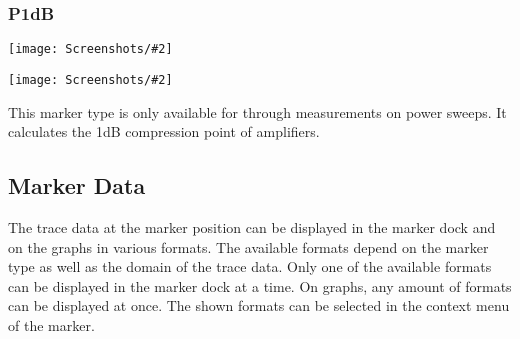 \documentclass[a4paper,11pt]{article}
\newcommand{\screenshot}[2]{\begin{center}
\texttt{[image: Screenshots/\#2]}
\end{center}}
\begin{document}
\subsubsection{P1dB}
\screenshot{1.0}{MarkerP1dBGraph.png}
\screenshot{1.0}{MarkerP1dBTable.png}
This marker type is only available for through measurements on power sweeps. It calculates the 1dB compression point of amplifiers.

\subsection{Marker Data}
The trace data at the marker position can be displayed in the marker dock and on the graphs in various formats. The available formats depend on the marker type as well as the domain of the trace data. Only one of the available formats can be displayed in the marker dock at a time. On graphs, any amount of formats can be displayed at once. The shown formats can be selected in the context menu of the marker.
\end{document}
